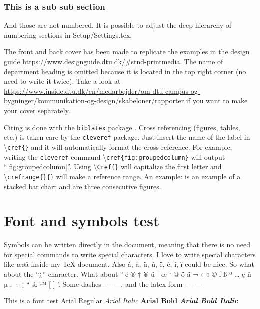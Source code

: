 \subsubsection{This is a sub sub section}
And those are not numbered. It is possible to adjust the deep hierarchy of numbering sections in Setup/Settings.tex. 

The front and back cover has been made to replicate the examples in the design guide \url{https://www.designguide.dtu.dk/#stnd-printmedia}. The name of department heading is omitted because it is located in the top right corner (no need to write it twice). Take a look at \url{https://www.inside.dtu.dk/en/medarbejder/om-dtu-campus-og-bygninger/kommunikation-og-design/skabeloner/rapporter} if you want to make your cover separately. 

Citing is done with the \texttt{biblatex} package \cite{1999_SummerSchool_Notes}. Cross referencing (figures, tables, etc.) is taken care by the \texttt{cleveref} package. Just insert the name of the label in \textbackslash \texttt{cref\{\}} and it will automatically format the cross-reference. For example, writing the \texttt{cleveref} command \textbackslash \texttt{cref\{fig:groupedcolumn\}} will output ``\cref{fig:groupedcolumn}''. Using \textbackslash \texttt{Cref\{\}} will capitalize the first letter and \textbackslash \texttt{crefrange\{\}\{\}} will make a reference range. An example:  is an example of a stacked bar chart and  are three consecutive figures.

\section{Font and symbols test}
Symbols can be written directly in the document, meaning that there is no need for special commands to write special characters. I love to write special characters like æøå inside my \TeX{} document. Also á, à, ü, û, ë, ê, î, ï could be nice. So what about the ``¿'' character. What about ° é ® † ¥ ü | œ ‘ @ ö ä ¬ ‹ « © ƒ ß ª … ç ñ µ ‚ · ¡ “ £ ™ [ ] '. Some dashes - – —, and the latex form - -- --- 

This is a font test \newline 
Arial Regular \newline 
\textit{Arial Italic} \newline 
\textbf{Arial Bold} \newline 
\textbf{\textit{Arial Bold Italic}}

